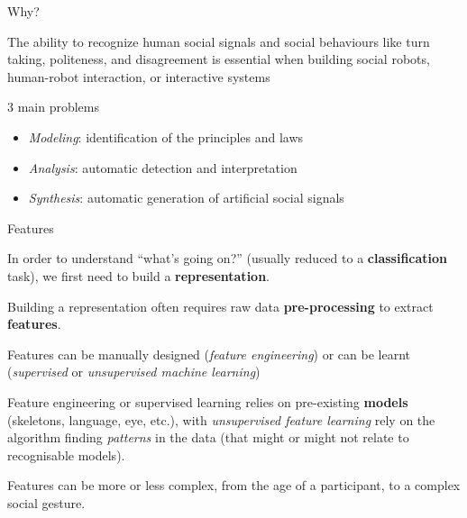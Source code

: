 \documentclass[compress]{beamer}
\begin{document}
\begin{frame}{Why?}

    The ability to recognize human social signals and social behaviours like turn
    taking, politeness, and disagreement is essential when building social
    robots, human-robot interaction, or interactive systems

\pause

    \begin{exampleblock}{3 main problems}

    \begin{itemize}
        \item \emph{Modeling}: identification of the principles and laws
        \item \emph{Analysis}: automatic detection and interpretation
        \item \emph{Synthesis}: automatic generation of artificial social
            signals
    \end{itemize}

    \end{exampleblock}
\end{frame}

\begin{frame}{Features}

    In order to understand ``what's going on?'' (usually reduced to a
    \textbf{classification} task), we first need to build a
    \textbf{representation}.

    \pause

    Building a representation often requires raw data
    \textbf{pre-processing} to extract \textbf{features}.

    Features can be manually designed (\emph{feature engineering}) or can be
    learnt (\emph{supervised} or \emph{unsupervised machine learning})

    \pause

    Feature engineering or supervised learning relies on pre-existing
    \textbf{models} (skeletons, language, eye, etc.), with \emph{unsupervised
    feature learning} rely on the algorithm finding \emph{patterns} in the data
    (that might or might not relate to recognisable models).

    \pause

    Features can be more or less complex, from the age of a participant, to a complex social gesture.

\end{frame}
\end{document}
